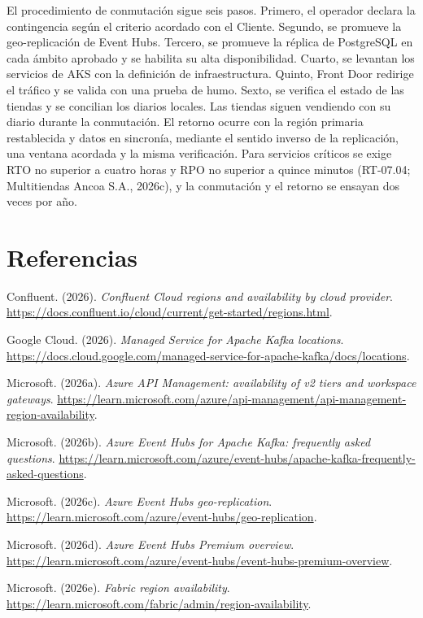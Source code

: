 \documentclass[11pt]{article}
\begin{document}
El procedimiento de conmutación sigue seis pasos. Primero, el operador declara la contingencia según el criterio acordado con el Cliente. Segundo, se promueve la geo-replicación de Event Hubs. Tercero, se promueve la réplica de PostgreSQL en cada ámbito aprobado y se habilita su alta disponibilidad. Cuarto, se levantan los servicios de AKS con la definición de infraestructura. Quinto, Front Door redirige el tráfico y se valida con una prueba de humo. Sexto, se verifica el estado de las tiendas y se concilian los diarios locales. Las tiendas siguen vendiendo con su diario durante la conmutación. El retorno ocurre con la región primaria restablecida y datos en sincronía, mediante el sentido inverso de la replicación, una ventana acordada y la misma verificación. Para servicios críticos se exige RTO no superior a cuatro horas y RPO no superior a quince minutos (RT-07.04; Multitiendas Ancoa S.A., 2026c), y la conmutación y el retorno se ensayan dos veces por año.

\section*{Referencias}

Confluent. (2026). \textit{Confluent Cloud regions and availability by cloud provider}. \url{https://docs.confluent.io/cloud/current/get-started/regions.html}.

Google Cloud. (2026). \textit{Managed Service for Apache Kafka locations}. \url{https://docs.cloud.google.com/managed-service-for-apache-kafka/docs/locations}.

Microsoft. (2026a). \textit{Azure API Management: availability of v2 tiers and workspace gateways}. \url{https://learn.microsoft.com/azure/api-management/api-management-region-availability}.

Microsoft. (2026b). \textit{Azure Event Hubs for Apache Kafka: frequently asked questions}. \url{https://learn.microsoft.com/azure/event-hubs/apache-kafka-frequently-asked-questions}.

Microsoft. (2026c). \textit{Azure Event Hubs geo-replication}. \url{https://learn.microsoft.com/azure/event-hubs/geo-replication}.

Microsoft. (2026d). \textit{Azure Event Hubs Premium overview}. \url{https://learn.microsoft.com/azure/event-hubs/event-hubs-premium-overview}.

Microsoft. (2026e). \textit{Fabric region availability}. \url{https://learn.microsoft.com/fabric/admin/region-availability}.
\end{document}
